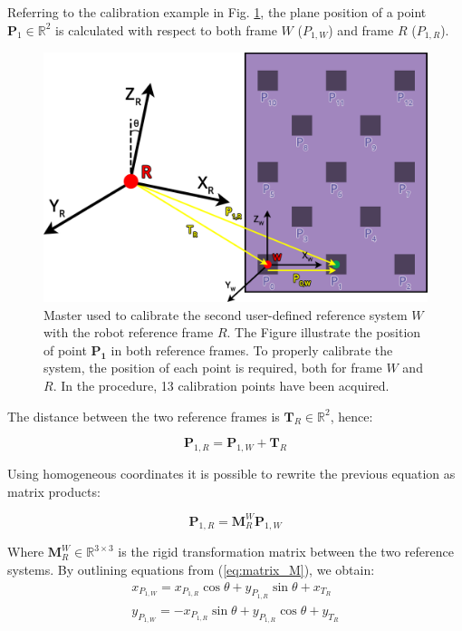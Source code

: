\documentclass[a4paper, 10 pt, conference]{ieeeconf}      %
\begin{document}
Referring to the calibration example in Fig. \ref{fig:master_robot}, the plane position of a point $\mathbf{P}_1\in\mathbb{R}^2$ is calculated with respect to both frame $W$ ($P_{1,W}$) and frame $R$ ($P_{1,R}$).

\begin{figure}[ht]
	\centering
	\includegraphics[width=1\columnwidth]{figures/calibration}
	\caption{Master used to calibrate the second user-defined reference system $W$ with the robot reference frame $R$. The Figure illustrate the position of  point $\mathbf{P_1}$ in both reference frames. To properly calibrate the system, the position of each point is required, both for frame $W$ and $R$. In the procedure, 13 calibration points have been acquired.}
	\label{fig:master_robot}
\end{figure}

The distance between the two reference frames is $\mathbf{T}_R\in\mathbb{R}^2$, hence:

\begin{equation}
\mathbf{P}_{1,R} = \mathbf{P}_{1,W} + \mathbf{T}_R
\end{equation}

Using homogeneous coordinates it is possible to rewrite the previous equation as matrix products:

\begin{equation}\label{eq:matrix_M}
\mathbf{P}_{1,R} = \mathbf{M}^W_{R}\mathbf{P}_{1,W}
\end{equation}

Where $\mathbf{M}^W_{R}\in\mathbb{R}^{3\times3}$ is the rigid transformation matrix between the two reference systems. By outlining equations from (\ref{eq:matrix_M}), we obtain:
\begin{equation}\label{eq:linear_sys1}
\begin{gathered}
x_{P_{1,W}}=x_{P_{1,R}}\cos\theta+y_{P_{1,R}}\sin\theta+x_{T_R}\\
y_{P_{1,W}}=-x_{P_{1,R}}\sin\theta+y_{P_{1,R}}\cos\theta+y_{T_R}
\end{gathered}
\end{equation}
\end{document}
